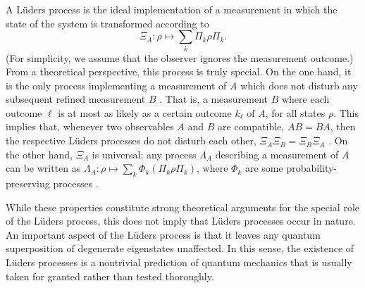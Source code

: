 \documentclass[12pt,
onecolumn,
superscriptaddress,
floatfix,
]{revtex4-2}
\begin{document}
A Lüders process is the ideal implementation of a measurement in which the 
 state of the system is transformed according to \cite{Heinosaari12}
%
\begin{equation}
 \Xi_A\colon \rho\mapsto \sum_k \Pi_k \rho \Pi_k.
\end{equation}
%
(For simplicity, we assume that the observer ignores the measurement outcome.)
From a theoretical perspective, this process is truly special.
On the one hand, it is the only process implementing a measurement of $A$ which 
 does not disturb any subsequent refined measurement $B$ \cite{Chiribella14, Kleinmann14}.
That is, a measurement $B$ where each outcome $\ell$ is at most as likely as a 
 certain outcome $k_{\ell}$ of $A$, for all states $\rho$.
This implies that, whenever two observables $A$ and $B$ are compatible, $AB= 
 BA$, then the respective Lüders processes do not disturb each other, 
 $\Xi_A\Xi_B= \Xi_B\Xi_A$ \cite{Luders51, Heinosaari12}.
On the other hand, $\Xi_A$ is universal: any process $\Lambda_A$ describing a 
 measurement of $A$ can be written as $\Lambda_A\colon \rho \mapsto 
 \sum_k\Phi_k(\Pi_k\rho\Pi_k)$, where $\Phi_k$ are some probability-preserving 
 processes \cite{Heinosaari12}.

While these properties constitute strong theoretical arguments for the special 
 role of the Lüders process, this does not imply that Lüders processes occur in nature.
An important aspect of the Lüders process is that it leaves any quantum 
 superposition of degenerate eigenstates unaffected.
In this sense, the existence of Lüders processes is a nontrivial prediction of 
 quantum mechanics that is usually taken for granted rather than tested 
 thoroughly.
\end{document}
